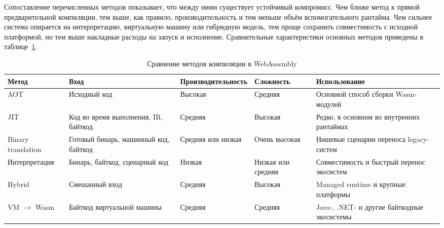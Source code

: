     \quad Сопоставление перечисленных методов показывает, что между ними существует устойчивый компромисс. Чем ближе метод к прямой предварительной компиляции, тем выше, как правило, производительность и тем меньше объём вспомогательного рантайма. Чем сильнее система опирается на интерпретацию, виртуальную машину или гибридную модель, тем проще сохранить совместимость с исходной платформой, но тем выше накладные расходы на запуск и исполнение. Сравнительные характеристики основных методов приведены в таблице~\ref{tab:compilation_methods}.

\begin{table}[htbp]
\centering
\scriptsize
\renewcommand{\arraystretch}{1.2}
\begin{tabular}{|p{2.4cm}|p{2.0cm}|p{2.8cm}|p{2.3cm}|p{3.5cm}|}
\hline
\textbf{Метод} & \textbf{Вход} & \textbf{Производительность} & \textbf{Сложность} & \textbf{Использование} \\
\hline
AOT & Исходный код & Высокая & Средняя & Основной способ сборки Wasm-модулей \\
\hline
JIT & Код во время выполнения, IR, байткод & Средняя & Высокая & Редко, в основном во внутренних рантаймах \\
\hline
Binary translation & Готовый бинарь, машинный код, байткод & Средняя или низкая & Очень высокая & Нишевые сценарии переноса legacy-систем \\
\hline
Интерпретация & Бинарь, байткод, сценарный код & Низкая & Низкая или средняя & Совместимость и быстрый перенос экосистем \\
\hline
Hybrid & Смешанный вход & Средняя & Высокая & Managed runtime и крупные платформы \\
\hline
VM $\rightarrow$ Wasm & Байткод виртуальной машины & Средняя & Средняя & Java-, .NET- и другие байткодные экосистемы \\
\hline
\end{tabular}
\caption{Сравнение методов компиляции в WebAssembly}
\label{tab:compilation_methods}
\end{table}
